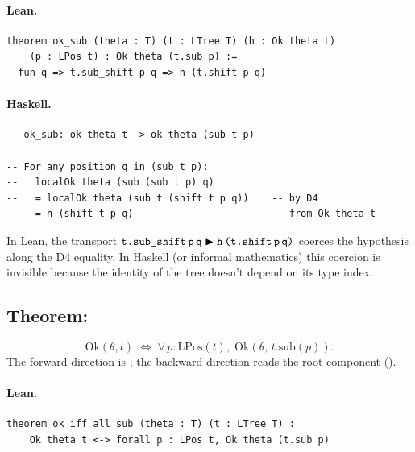 \documentclass[11pt,a4paper]{article}
\begin{document}
\paragraph{Lean.}
\begin{lstlisting}[style=lean]
theorem ok_sub (theta : T) (t : LTree T) (h : Ok theta t)
    (p : LPos t) : Ok theta (t.sub p) :=
  fun q => t.sub_shift p q => h (t.shift p q)
\end{lstlisting}

\paragraph{Haskell.}
\begin{lstlisting}[style=haskell]
-- ok_sub: ok theta t -> ok theta (sub t p)
--
-- For any position q in (sub t p):
--   localOk theta (sub (sub t p) q)
--   = localOk theta (sub t (shift t p q))    -- by D4
--   = h (shift t p q)                        -- from Ok theta t
\end{lstlisting}

\begin{fidelitynote}
In Lean, the transport $\texttt{t.sub\_shift\,p\,q} \blacktriangleright
\texttt{h\,(t.shift\,p\,q)}$ coerces the hypothesis along the D4 equality.
In Haskell (or informal mathematics) this coercion is invisible because the
identity of the tree doesn't depend on its type index.
\end{fidelitynote}


\subsection{Theorem: }

\begin{thm}
\[
  \mathrm{Ok}(\theta, t) \;\iff\;
  \forall\, p : \mathrm{LPos}(t),\;
  \mathrm{Ok}(\theta,\, t.\mathrm{sub}(p)).
\]
The forward direction is ; the backward direction reads the
root component ().
\end{thm}

\paragraph{Lean.}
\begin{lstlisting}[style=lean]
theorem ok_iff_all_sub (theta : T) (t : LTree T) :
    Ok theta t <-> forall p : LPos t, Ok theta (t.sub p)
\end{lstlisting}
\end{document}
